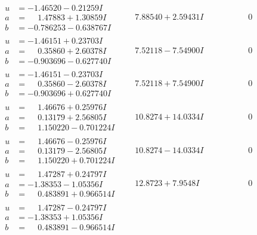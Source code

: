 \documentclass[1p]{elsarticle_modified}
\theoremstyle{definition}
\begin{document}
$$\begin{array}{c|c|c}
\begin{aligned}
u &= -1.46520 - 0.21259 I \\
a &= \phantom{-}1.47883 + 1.30859 I \\
b &= -0.786253 - 0.638767 I\end{aligned}
 & \phantom{-}7.88540 + 2.59431 I & \phantom{-0.000000 } 0 \\ \hline\begin{aligned}
u &= -1.46151 + 0.23703 I \\
a &= \phantom{-}0.35860 + 2.60378 I \\
b &= -0.903696 - 0.627740 I\end{aligned}
 & \phantom{-}7.52118 - 7.54900 I & \phantom{-0.000000 } 0 \\ \hline\begin{aligned}
u &= -1.46151 - 0.23703 I \\
a &= \phantom{-}0.35860 - 2.60378 I \\
b &= -0.903696 + 0.627740 I\end{aligned}
 & \phantom{-}7.52118 + 7.54900 I & \phantom{-0.000000 } 0 \\ \hline\begin{aligned}
u &= \phantom{-}1.46676 + 0.25976 I \\
a &= \phantom{-}0.13179 + 2.56805 I \\
b &= \phantom{-}1.150220 - 0.701224 I\end{aligned}
 & \phantom{-}10.8274 + 14.0334 I & \phantom{-0.000000 } 0 \\ \hline\begin{aligned}
u &= \phantom{-}1.46676 - 0.25976 I \\
a &= \phantom{-}0.13179 - 2.56805 I \\
b &= \phantom{-}1.150220 + 0.701224 I\end{aligned}
 & \phantom{-}10.8274 - 14.0334 I & \phantom{-0.000000 } 0 \\ \hline\begin{aligned}
u &= \phantom{-}1.47287 + 0.24797 I \\
a &= -1.38353 - 1.05356 I \\
b &= \phantom{-}0.483891 + 0.966514 I\end{aligned}
 & \phantom{-}12.8723 + 7.9548 I & \phantom{-0.000000 } 0 \\ \hline\begin{aligned}
u &= \phantom{-}1.47287 - 0.24797 I \\
a &= -1.38353 + 1.05356 I \\
b &= \phantom{-}0.483891 - 0.966514 I\end{aligned}

\end{array}$$
\end{document}
